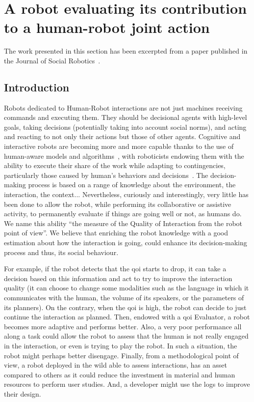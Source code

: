 \documentclass[a4paper,11pt,twoside]{StyleThese}
\begin{document}
\section{A robot evaluating its contribution to a human-robot joint action}\label{chap2:sec:qoi}

The work presented in this section has been excerpted from a paper published in the Journal of Social Robotics~\cite{mayima_2021_towards}.

\subsection{Introduction}

Robots dedicated to Human-Robot interactions are not just machines receiving commands and executing them. They should be decisional agents with high-level goals, taking decisions (potentially taking into account social norms), and acting and reacting to not only their actions but those of other agents. Cognitive and interactive robots are becoming more and more capable thanks to the use of human-aware models and algorithms~\cite{kruse2013,thomaz_2016_computational}, with roboticists endowing them with the ability to execute their share of the work while adapting to contingencies, particularly those caused by human's behaviors and decisions~\cite{hoffman_2007_fluency,cakmak_2017,lemaignan_2017_artificial}. The decision-making process is based on a range of knowledge about the environment, the interaction, the context... Nevertheless, curiously and interestingly, very little has been done to allow the robot, while performing its collaborative or assistive activity, to permanently evaluate if things are going well or not, as humans do. We name this ability ``the measure of the Quality of Interaction from the robot point of view''. We believe that enriching the robot knowledge with a good estimation about how the interaction is going, could enhance its decision-making process and thus, its social behaviour.

For example, if the robot detects that the \acrshort{qoi} starts to drop, it can take a decision based on this information and act to try to improve the interaction quality (\eg it can choose to change some modalities such as the language in which it communicates with the human, the volume of its speakers, or the parameters of its planners). On the contrary, when the \acrshort{qoi} is high, the robot can decide to just continue the interaction as planned. Then, endowed with a \acrshort{qoi} Evaluator, a robot becomes more adaptive and performs better. Also, a very poor performance all along a task could allow the robot to assess that the human is not really engaged in the interaction, or even is trying to play the robot. In such a situation, the robot might perhaps better disengage. 
Finally, from a methodological point of view, a robot deployed in the wild able to assess interactions, has an asset compared to others as it could reduce the investment in material and human resources to perform user studies. And, a developer might use the logs to improve their design. 
\end{document}
